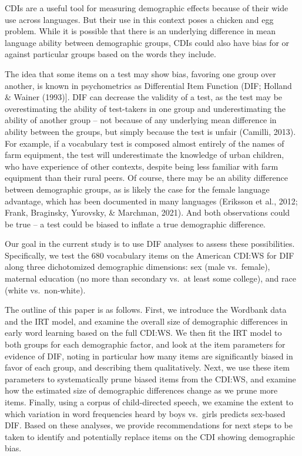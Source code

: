 \documentclass[10pt, letterpaper]{article}
\begin{document}
CDIs are a useful tool for measuring demographic effects because of
their wide use across languages. But their use in this context poses a
chicken and egg problem. While it is possible that there is an
underlying difference in mean language ability between demographic
groups, CDIs could also have bias for or against particular groups based
on the words they include.

The idea that some items on a test may show bias, favoring one group
over another, is known in psychometrics as Differential Item Function
(DIF; Holland \& Wainer (1993){]}. DIF can decrease the validity of a
test, as the test may be overestimating the ability of test-takers in
one group and underestimating the ability of another group -- not
because of any underlying mean difference in ability between the groups,
but simply because the test is unfair (Camilli, 2013). For example, if a
vocabulary test is composed almost entirely of the names of farm
equipment, the test will underestimate the knowledge of urban children,
who have experience of other contexts, despite being less familiar with
farm equipment than their rural peers. Of course, there may be an
ability difference between demographic groups, as is likely the case for
the female language advantage, which has been documented in many
languages (Eriksson et al., 2012; Frank, Braginsky, Yurovsky, \&
Marchman, 2021). And both observations could be true -- a test could be
biased to inflate a true demographic difference.

Our goal in the current study is to use DIF analyses to assess these
possibilities. Specifically, we test the 680 vocabulary items on the
American CDI:WS for DIF along three dichotomized demographic dimensions:
sex (male vs.~female), maternal education (no more than secondary vs.~at
least some college), and race (white vs.~non-white).

The outline of this paper is as follows. First, we introduce the
Wordbank data and the IRT model, and examine the overall size of
demographic differences in early word learning based on the full CDI:WS.
We then fit the IRT model to both groups for each demographic factor,
and look at the item parameters for evidence of DIF, noting in
particular how many items are significantly biased in favor of each
group, and describing them qualitatively. Next, we use these item
parameters to systematically prune biased items from the CDI:WS, and
examine how the estimated size of demographic differences change as we
prune more items. Finally, using a corpus of child-directed speech, we
examine the extent to which variation in word frequencies heard by boys
vs.~girls predicts sex-based DIF. Based on these analyses, we provide
recommendations for next steps to be taken to identify and potentially
replace items on the CDI showing demographic bias.
\end{document}
